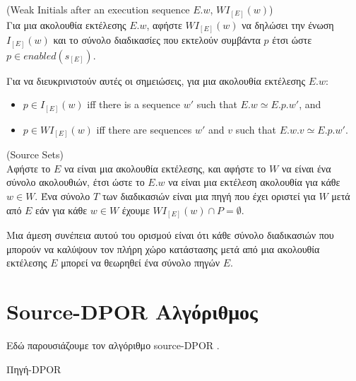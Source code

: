 \begin{definition}{(Weak Initials after an execution sequence $E.w$, $WI_{[E]}(w)$)}\\
Για μια ακολουθία εκτέλεσης $E.w$, αφήστε $WI_{[E]}(w)$ να δηλώσει την ένωση $I_{[E]}(w)$ και το σύνολο
διαδικασίες που εκτελούν συμβάντα $p$ έτσι ώστε $p \in enabled(s_{[E]}) $.
\end{definition}

Για να διευκρινιστούν αυτές οι σημειώσεις, για μια ακολουθία εκτέλεσης $E.w$:
\begin{itemize}
    \item  $p \in I_{[E]}(w)$ iff there is a sequence $w'$ such that $E.w \simeq E.p.w'$, and
    \item  $p \in WI_{[E]}(w)$ iff there are sequences $w'$ and $v$ such that $E.w.v \simeq E.p.w'$.
\end{itemize}

\begin{definition}{(Source Sets)}\label{def:Source Sets}\\
Αφήστε το $E$ να είναι μια ακολουθία εκτέλεσης,
και αφήστε το $W$ να είναι ένα σύνολο ακολουθιών, έτσι ώστε το $E.w$ να είναι μια εκτέλεση
ακολουθία για κάθε $w \in W$. Ένα σύνολο $T$ των διαδικασιών είναι μια πηγή που έχει οριστεί για
$W$ μετά από $E$ εάν για κάθε $w \in W$ έχουμε $WI_{[E]}(w) \cap P  = \emptyset$.
\end{definition}

Μια άμεση συνέπεια αυτού του ορισμού είναι ότι κάθε
σύνολο διαδικασιών που μπορούν να καλύψουν τον πλήρη χώρο κατάστασης μετά από μια ακολουθία εκτέλεσης $E$
μπορεί να θεωρηθεί ένα σύνολο πηγών $E$.

\section{Source-DPOR Αλγόριθμος}
Εδώ παρουσιάζουμε τον αλγόριθμο source-DPOR \cite{AbdullaAronisJohnssonSagonasDPOR2014}.

\begin{algorithm}
    \caption{Πηγή-DPOR}
    \label{Source}
\end{algorithm}

